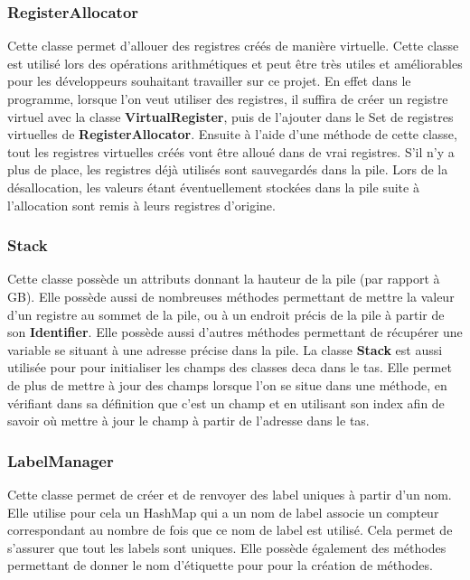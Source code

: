 \documentclass[12pt, a4paper, one side]{article}
\begin{document}
    \subsubsection{RegisterAllocator}

    Cette classe permet d'allouer des registres créés de manière virtuelle.
    Cette classe est utilisé lors des opérations arithmétiques et peut être
    très utiles et améliorables pour les développeurs souhaitant travailler
    sur ce projet. En effet dans le programme, lorsque l'on veut utiliser
    des registres, il suffira de créer un registre virtuel avec la classe
    \textbf{VirtualRegister}, puis de l'ajouter dans le Set de registres
    virtuelles de \textbf{RegisterAllocator}. Ensuite à l'aide d'une méthode
    de cette classe, tout les registres virtuelles créés vont être alloué
    dans de vrai registres. S'il n'y a plus de place, les registres déjà
    utilisés sont sauvegardés dans la pile.
    Lors de la désallocation, les valeurs étant éventuellement stockées dans la
    pile suite à l'allocation sont remis à leurs registres d'origine.

    \subsubsection{Stack}

    Cette classe possède un attributs donnant la hauteur de la pile (par rapport
    à GB). Elle possède aussi
    de nombreuses méthodes permettant de mettre la valeur d'un registre au
    sommet de la pile, ou à un
    endroit précis de la pile à partir de son \textbf{Identifier}. Elle possède
    aussi d'autres méthodes permettant de récupérer une variable
    se situant à une adresse précise dans la pile.
    La classe \textbf{Stack} est aussi utilisée pour pour initialiser les champs
    des classes deca dans le tas. Elle permet de plus de mettre à jour des
    champs lorsque l'on se situe dans une méthode, en vérifiant dans sa
    définition que c'est un champ et en utilisant son index afin de savoir où
    mettre à jour le champ à partir de l'adresse dans le tas.


    \subsubsection{LabelManager}

    Cette classe permet de créer et de renvoyer des label uniques à partir d'un
    nom. Elle utilise pour cela un HashMap
    qui a un nom de label associe un compteur correspondant au nombre de fois
    que ce nom de label est utilisé. Cela
    permet de s'assurer que tout les labels sont uniques. Elle possède également
    des méthodes permettant de donner le nom d'étiquette pour pour la création
    de méthodes.
\end{document}
